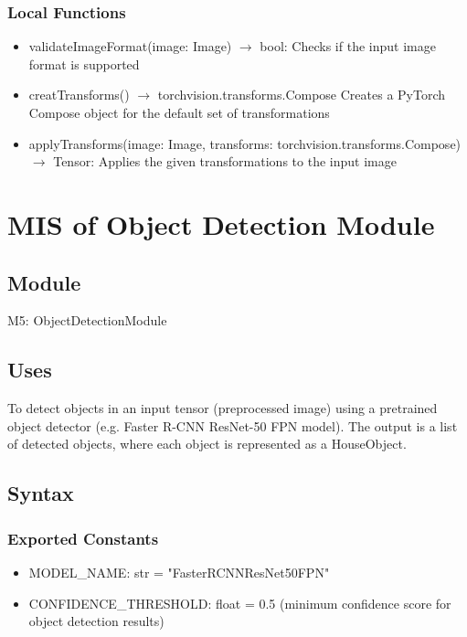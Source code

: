 \documentclass[12pt, titlepage]{article}
\begin{document}
\subsubsection{Local Functions}

\begin{itemize}
  \item validateImageFormat(image: Image) $\rightarrow$ bool: Checks if the input image format is supported
  \item creatTransforms() $\rightarrow$ torchvision.transforms.Compose\: Creates a PyTorch Compose object for the default set of transformations
  \item applyTransforms(image: Image, transforms: torchvision.transforms.Compose) $\rightarrow$ Tensor: Applies the given transformations to the input image
\end{itemize}

\newpage

\section{MIS of Object Detection Module} \label{Module} 

\subsection{Module}

M5: ObjectDetectionModule

\subsection{Uses}
To detect objects in an input tensor (preprocessed image) using a pretrained object detector (e.g. Faster R-CNN ResNet-50 FPN model). The output is a list of detected objects, where each object is represented as a HouseObject.

\subsection{Syntax}

\subsubsection{Exported Constants}

\begin{itemize}
  \item MODEL{\_}NAME: str = "FasterRCNNResNet50FPN"
  \item CONFIDENCE{\_}THRESHOLD: float = 0.5 (minimum confidence score for object detection results)
\end{itemize}
\end{document}
